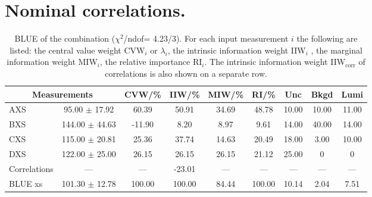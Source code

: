 \section{Nominal correlations.}
\begin{table}[H]
\scriptsize
\begin{center}
\renewcommand{\arraystretch}{1.1}
\begin{tabular}{|lc|c|c|c|c|ccc|}
\hline
\multicolumn{2}{|c|}{Measurements} & CVW/\%  & IIW/\%  & MIW/\%  & RI/\%  & {\tiny Unc} & {\tiny Bkgd} & {\tiny Lumi}\\
\hline
AXS &      95.00 $\pm$      17.92 &      60.39 &      50.91 &      34.69 &      48.78 &      10.00 &      10.00 &      11.00\\
BXS &     144.00 $\pm$      44.63 &     -11.90 &       8.20 &       8.97 &       9.61 &      14.00 &      40.00 &      14.00\\
CXS &     115.00 $\pm$      20.81 &      25.36 &      37.74 &      14.63 &      20.49 &      18.00 &       3.00 &      10.00\\
DXS &     122.00 $\pm$      25.00 &      26.15 &      26.15 &      26.15 &      21.12 &      25.00 &  0 &  0\\
Correlations & --- & --- &     -23.01 & --- & --- & --- & --- & ---\\
\hline
BLUE {\tiny xs} &     101.30 $\pm$      12.78 &     100.00 &     100.00 &      84.44 &     100.00 &      10.14 &       2.04 &       7.51\\
\hline
\end{tabular}
\caption{BLUE of the combination ($\chi^2$/ndof=      4.23/3).
 For each input measurement $i$ the following are listed: the central value weight CVW$_i$ or $\lambda_i$, the intrinsic information weight IIW$_i$ , the marginal information weight MIW$_i$, the relative importance RI$_i$. The intrinsic information weight IIW$_{\mathrm{corr}}$ of correlations is also shown on a separate row.}
\renewcommand{\arraystretch}{1}
\end{center}
\end{table}

